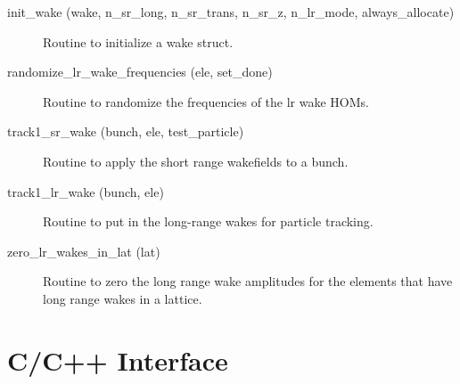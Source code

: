 \begin{description}

\label{r:init.wake}
\item[init_wake (wake, n_sr_long, n_sr_trans, n_sr_z, n_lr_mode, always_allocate)] \Newline 
Routine to initialize a wake struct.

\label{r:randomize.lr.wake.frequencies}
\item[randomize_lr_wake_frequencies (ele, set_done)] \Newline 
Routine to randomize the frequencies of the lr wake HOMs.

\label{r:track1.sr.wake}
\item[track1_sr_wake (bunch, ele, test_particle)] \Newline 
Routine to apply the short range wakefields to a bunch. 

\label{r:track1.lr.wake}
\item[track1_lr_wake (bunch, ele)] \Newline 
Routine to put in the long-range wakes for particle tracking.

\label{r:zero.lr.wakes.in.lat}
\item[zero_lr_wakes_in_lat (lat)] \Newline 
Routine to zero the long range wake amplitudes for the elements that have
long range wakes in a lattice.

\end{description}

\section{C/C++ Interface}
\label{r:c.interface}  

